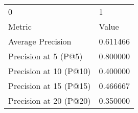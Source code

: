\begin{tabular}{ll}
0 & 1 \\
Metric & Value \\
Average Precision & 0.611466 \\
Precision at 5 (P@5) & 0.800000 \\
Precision at 10 (P@10) & 0.400000 \\
Precision at 15 (P@15) & 0.466667 \\
Precision at 20 (P@20) & 0.350000 \\
\end{tabular}
